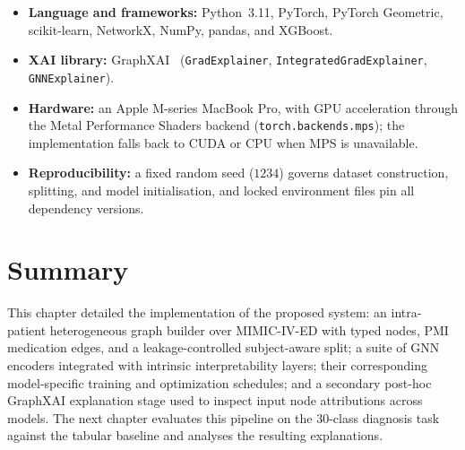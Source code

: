 \begin{itemize}
  \item \textbf{Language and frameworks:} Python~3.11, PyTorch, PyTorch
        Geometric, scikit-learn, NetworkX, NumPy, pandas, and XGBoost.
  \item \textbf{XAI library:} GraphXAI~\cite{agarwal2023graphxai}
        (\texttt{GradExplainer}, \texttt{IntegratedGradExplainer},
        \texttt{GNNExplainer}).
  \item \textbf{Hardware:} an Apple M-series MacBook Pro, with GPU acceleration
        through the Metal Performance Shaders backend
        (\texttt{torch.backends.mps}); the implementation falls back to CUDA or
        CPU when MPS is unavailable.
  \item \textbf{Reproducibility:} a fixed random seed ($1234$) governs dataset
        construction, splitting, and model initialisation, and locked
        environment files pin all dependency versions.
\end{itemize}

\section{Summary}

This chapter detailed the implementation of the proposed system: an
intra-patient heterogeneous graph builder over MIMIC-IV-ED with typed nodes, PMI medication edges, and a leakage-controlled subject-aware split; a suite of GNN encoders integrated with intrinsic interpretability layers; their corresponding model-specific training and optimization schedules;  and a secondary post-hoc GraphXAI explanation stage used to inspect input node attributions across models. The next chapter evaluates this pipeline on the 30-class diagnosis task against the tabular baseline and analyses the resulting explanations.